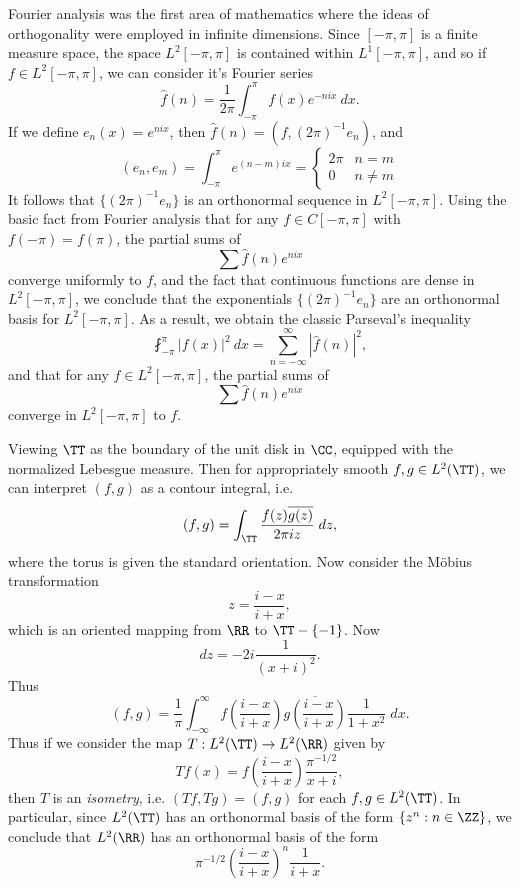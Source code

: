 \begin{example}
    Fourier analysis was the first area of mathematics where the ideas of orthogonality were employed in infinite dimensions. Since $[-\pi,\pi]$ is a finite measure space, the space $L^2[-\pi,\pi]$ is contained within $L^1[-\pi,\pi]$, and so if $f \in L^2[-\pi,\pi]$, we can consider it's Fourier series
    \[ \widehat{f}(n) = \frac{1}{2\pi} \int_{-\pi}^\pi f(x) e^{-nix}\ dx. \]
    If we define $e_n(x) = e^{nix}$, then $\widehat{f}(n) = (f,(2\pi)^{-1} e_n)$, and
    \[ (e_n,e_m) = \int_{-\pi}^\pi e^{(n-m)ix} = \begin{cases} 2 \pi & n = m \\ 0 & n \neq m \end{cases} \]
    It follows that $\{ (2 \pi)^{-1} e_n \}$ is an orthonormal sequence in $L^2[-\pi,\pi]$. Using the basic fact from Fourier analysis that for any $f \in C[-\pi,\pi]$ with $f(-\pi) = f(\pi)$, the partial sums of
    \[ \sum \widehat{f}(n) e^{nix} \]
    converge uniformly to $f$, and the fact that continuous functions are dense in $L^2[-\pi,\pi]$, we conclude that the exponentials $\{ (2\pi)^{-1} e_n \}$ are an orthonormal basis for $L^2[-\pi,\pi]$. As a result, we obtain the classic Parseval's inequality
    \[ \fint_{-\pi}^\pi |f(x)|^2\ dx = \sum_{n = -\infty}^\infty |\widehat{f}(n)|^2, \]
    and that for any $f \in L^2[-\pi,\pi]$, the partial sums of
    \[ \sum \widehat{f}(n) e^{nix} \]
    converge in $L^2[-\pi,\pi]$ to $f$.
\end{example}

\begin{example}
    Viewing $\TT$ as the boundary of the unit disk in $\CC$, equipped with the normalized Lebesgue measure. Then for appropriately smooth $f,g \in L^2(\TT)$, we can interpret $(f,g)$ as a contour integral, i.e.
    \[ (f,g) = \int_{\TT} \frac{f(z) \overline{g(z)}}{2 \pi iz}\; dz, \]
    where the torus is given the standard orientation. Now consider the M\"{o}bius transformation
    \[ z = \frac{i - x}{i + x}, \]
    which is an oriented mapping from $\RR$ to $\TT - \{ -1 \}$. Now
    \[ dz = -2i \frac{1}{(x + i)^2}. \]
    Thus
    \[ (f,g) = \frac{1}{\pi} \int_{-\infty}^\infty f \left( \frac{i - x}{i + x} \right) \overline{g \left( \frac{i - x}{i + x} \right)} \frac{1}{1 + x^2}\; dx. \]
    Thus if we consider the map $T: L^2(\TT) \to L^2(\RR)$ given by
    \[ Tf(x) = f \left( \frac{i - x}{i + x} \right) \frac{\pi^{-1/2}}{x + i}, \]
    then $T$ is an \emph{isometry}, i.e. $(Tf, Tg) = (f,g)$ for each $f,g \in L^2(\TT)$. In particular, since $L^2(\TT)$ has an orthonormal basis of the form $\{ z^n : n \in \ZZ \}$, we conclude that $L^2(\RR)$ has an orthonormal basis of the form
    \[ \pi^{-1/2} \left( \frac{i - x}{i + x} \right)^n \frac{1}{i + x}. \]
\end{example}

